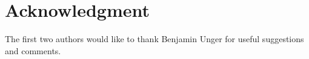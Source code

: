 \documentclass[final,reqno]{siamltex}
\begin{document}
\section*{Acknowledgment} The first two authors would like to thank Benjamin Unger for useful 
suggestions and comments.


%

\end{document}
